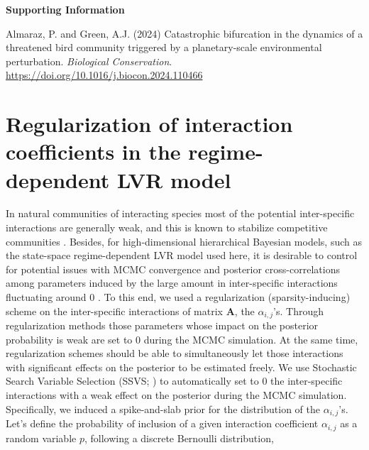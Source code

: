 \documentclass[11pt]{article}
\begin{document}
\noindent \textbf{\LARGE{Supporting Information}}\\

\vspace{0.2in}

\noindent \large{Almaraz, P. and Green, A.J. (2024) Catastrophic bifurcation in the dynamics of a threatened bird community triggered by a planetary-scale environmental perturbation. \textit{Biological Conservation}. \url{https://doi.org/10.1016/j.biocon.2024.110466}

\vspace{0.7in}

\def\tightlist{}

\tableofcontents
{}

\newpage

\linenumbers


\section{Regularization of interaction coefficients in the regime-dependent LVR model}

In natural communities of interacting species most of the potential inter-specific interactions are generally weak, and this is known to stabilize competitive communities \cite{McCann1998,Berlow1999,Neutel2008,Mutshinda2009,Barabas2016,Wootton2016,Downing2020,Gellner2023}. Besides, for high-dimensional hierarchical Bayesian models, such as the state-space regime-dependent LVR model used here, it is desirable to control for potential issues with MCMC convergence and posterior cross-correlations among parameters induced by the large amount in inter-specific interactions fluctuating around 0 \cite{Almaraz2011,Almaraz2012,Mutshinda2009,Mutshinda2011}. To this end, we used a regularization (sparsity-inducing) scheme on the inter-specific interactions of matrix $\mathbf{A}$, the $\alpha_{i,j}$'s. Through regularization methods those parameters whose impact on the posterior probability is weak are set to 0 during the MCMC simulation. At the same time, regularization schemes should be able to simultaneously let those interactions with significant effects on the posterior to be estimated freely. We use Stochastic Search Variable Selection (SSVS; \cite{George1993}) to automatically set to 0 the inter-specific interactions with a weak effect on the posterior during the MCMC simulation. Specifically, we induced a spike-and-slab prior \cite{Ishwaran2005} for the distribution of the $\alpha_{i,j}$'s. Let's define the probability of inclusion of a given interaction coefficient $\alpha_{i,j}$ as a random variable $p$, following a discrete Bernoulli distribution,

}
\end{document}
